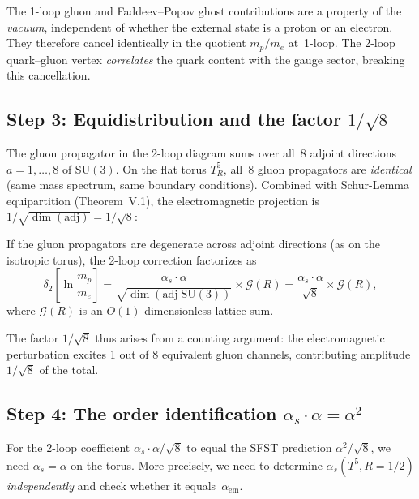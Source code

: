 \begin{remark}
The 1-loop gluon and Faddeev--Popov ghost contributions are a property
of the \emph{vacuum}, independent of whether the external state is a
proton or an electron.  They therefore cancel identically in the
quotient $m_p/m_e$ at~1-loop.  The 2-loop quark--gluon vertex
\emph{correlates} the quark content with the gauge sector, breaking
this cancellation.
\end{remark}

\subsection{Step 3: Equidistribution and the factor $1/\!\sqrt{8}$}
\label{sec:equidist}

The gluon propagator in the 2-loop diagram sums over all~8 adjoint
directions $a=1,\ldots,8$ of $\mathrm{SU}(3)$.  On the flat torus
$T^5_R$, all~8 gluon propagators are \emph{identical} (same mass
spectrum, same boundary conditions).  Combined with Schur-Lemma
equipartition (Theorem~V.1), the electromagnetic projection is
$1/\sqrt{\dim(\mathrm{adj})} = 1/\sqrt{8}$:

\begin{proposition}\label{prop:sqrt8}
If the gluon propagators are degenerate across adjoint directions
(as on the isotropic torus), the 2-loop correction factorizes as
\[
  \delta_2\!\left[\ln\frac{m_p}{m_e}\right]
  = \frac{\alpha_s\cdot\alpha}{\sqrt{\dim(\mathrm{adj}\;\mathrm{SU}(3))}}
    \times \mathcal{G}(R)
  = \frac{\alpha_s\cdot\alpha}{\sqrt{8}} \times \mathcal{G}(R),
\]
where $\mathcal{G}(R)$ is an $O(1)$ dimensionless lattice sum.
\end{proposition}

The factor $1/\sqrt{8}$ thus arises from a counting argument:
the electromagnetic perturbation excites 1 out of 8 equivalent
gluon channels, contributing amplitude $1/\sqrt{8}$ of the total.

\subsection{Step 4: The order identification $\alpha_s\cdot\alpha = \alpha^2$}
\label{sec:ordermatch}

For the 2-loop coefficient $\alpha_s\cdot\alpha/\sqrt{8}$ to equal the
SFST prediction $\alpha^2/\sqrt{8}$, we need $\alpha_s = \alpha$ on
the torus.  More precisely, we need to determine $\alpha_s(T^5,R=1/2)$
\emph{independently} and check whether it equals~$\alpha_{\mathrm{em}}$.

